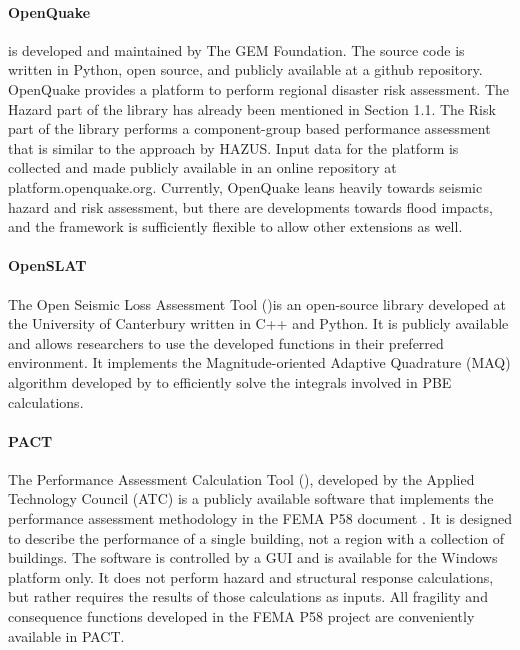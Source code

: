 \paragraph{OpenQuake} 
 is developed and maintained by The GEM Foundation. The source code is written in Python, open source, and publicly available at a github repository. OpenQuake provides a platform to perform regional disaster risk assessment. The Hazard part of the library has already been mentioned in Section 1.1. The Risk part of the library performs a component-group based performance assessment that is similar to the approach by HAZUS. Input data for the platform is collected and made publicly available in an online repository at platform.openquake.org. Currently, OpenQuake leans heavily towards seismic hazard and risk assessment, but there are developments towards flood impacts, and the framework is sufficiently flexible to allow other extensions as well.

\paragraph{OpenSLAT} The Open Seismic Loss Assessment Tool ()is an open-source library developed at the University of Canterbury written in C++ and Python. It is publicly available and allows researchers to use the developed functions in their preferred environment. It implements the Magnitude-oriented Adaptive Quadrature (MAQ) algorithm developed by \cite{bradley2010efficient} to efficiently solve the integrals involved in PBE calculations.


\paragraph{PACT} The Performance Assessment Calculation Tool (), developed by the Applied Technology Council (ATC) is a publicly available software that implements the performance assessment methodology in the FEMA P58 document \citep{atc2018p-58-2}. It is designed to describe the performance of a single building, not a region with a collection of buildings. The software is controlled by a GUI and is available for the Windows platform only. It does not perform hazard and structural response calculations, but rather requires the results of those calculations as inputs. All fragility and consequence functions developed in the FEMA P58 project are conveniently available in PACT.

